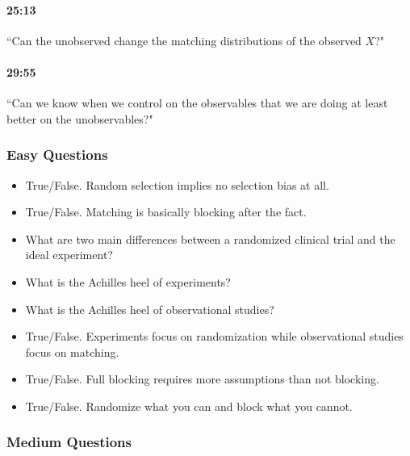 \documentclass[11pt]{article}
\begin{document}
\paragraph{25:13} ``Can the unobserved change the matching distributions of the observed $X$?"

\paragraph{29:55} ``Can we know when we control on the observables that we are doing at least better on the unobservables?"



\subsubsection{Easy Questions}

\begin{itemize}

\item True/False.  Random selection implies no selection bias at all.

\item True/False.  Matching is basically blocking after the fact.

\item What are two main differences between a randomized clinical trial and the ideal experiment?

\item What is the Achilles heel of experiments?

\item What is the Achilles heel of observational studies?

\item True/False.  Experiments focus on randomization while observational studies focus on matching.

\item True/False.  Full blocking requires more assumptions than not blocking.

\item True/False.  Randomize what you can and block what you cannot.



\end{itemize}

\subsubsection{Medium Questions}
\end{document}
